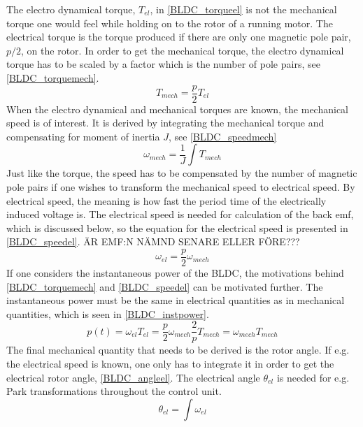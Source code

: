 \documentclass{LTHthesis}
\begin{document}
The electro dynamical torque, $T_{el}$, in \eqref{BLDC_torqueel} is not the mechanical torque one would feel while holding on to the rotor of a running motor. The electrical torque is the torque produced if there are only one magnetic pole pair, $p/2$, on the rotor. In order to get the mechanical torque, the electro dynamical torque has to be scaled by a factor which is the number of pole pairs, see \eqref{BLDC_torquemech}.
\begin{equation} \label{BLDC_torquemech}
T_{mech}=\frac{p}{2}T_{el}
\end{equation}
When the electro dynamical and mechanical torques are known, the mechanical speed is of interest. It is derived by integrating the mechanical torque and compensating for moment of inertia $J$, see \eqref{BLDC_speedmech}
\begin{equation} \label{BLDC_speedmech}
\omega_{mech}=\frac{1}{J}\int T_{mech}
\end{equation}
Just like the torque, the speed has to be compensated by the number of magnetic pole pairs if one wishes to transform the mechanical speed to electrical speed. By electrical speed, the meaning is how fast the period time of the electrically induced voltage is. The electrical speed is needed for calculation of the back emf, which is discussed below, so the equation for the electrical speed is presented in \eqref{BLDC_speedel}. ÄR EMF:N NÄMND SENARE ELLER FÖRE???
\begin{equation} \label{BLDC_speedel}
\omega_{el}=\frac{p}{2}\omega_{mech}
\end{equation}
If one considers the instantaneous power of the BLDC, the motivations behind \eqref{BLDC_torquemech} and \eqref{BLDC_speedel} can be motivated further. The instantaneous power must be the same in electrical quantities as in mechanical quantities, which is seen in \eqref{BLDC_instpower}.
\begin{equation} \label{BLDC_instpower}
p(t)=\omega_{el}T_{el}=\frac{p}{2}\omega_{mech}\frac{2}{p}T_{mech}=\omega_{mech}T_{mech}
\end{equation}
The final mechanical quantity that needs to be derived is the rotor angle. If e.g. the electrical speed is known, one only has to integrate it in order to get the electrical rotor angle, \eqref{BLDC_angleel}. The electrical angle $\theta_{el}$ is needed for e.g. Park transformations throughout the control unit. 
\begin{equation} \label{BLDC_angleel}
\theta_{el}=\int \omega_{el}
\end{equation}
\end{document}
